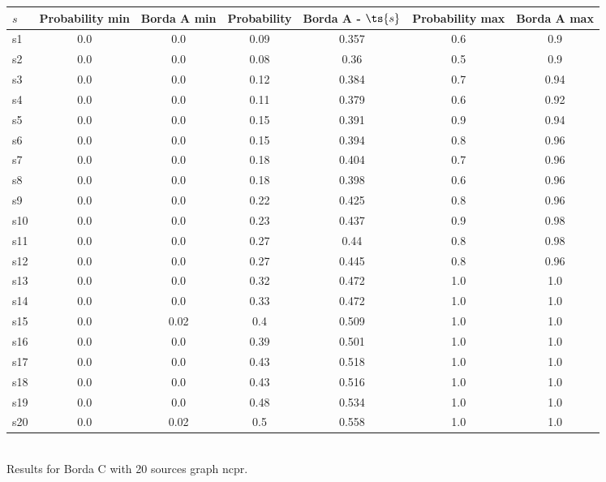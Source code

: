 \documentclass{article}
\begin{document}
\noindent\begin{tabular}{|l|c|c|c|c|c|c|}
\hline
$s$& Probability min & Borda A min & Probability & Borda A - $\ts{s}$ & Probability max & Borda A max\\
\hline
s1 &0.0 & 0.0 & 0.09 & 0.357 & 0.6 & 0.9\\
\hline
s2 &0.0 & 0.0 & 0.08 & 0.36 & 0.5 & 0.9\\
\hline
s3 &0.0 & 0.0 & 0.12 & 0.384 & 0.7 & 0.94\\
\hline
s4 &0.0 & 0.0 & 0.11 & 0.379 & 0.6 & 0.92\\
\hline
s5 &0.0 & 0.0 & 0.15 & 0.391 & 0.9 & 0.94\\
\hline
s6 &0.0 & 0.0 & 0.15 & 0.394 & 0.8 & 0.96\\
\hline
s7 &0.0 & 0.0 & 0.18 & 0.404 & 0.7 & 0.96\\
\hline
s8 &0.0 & 0.0 & 0.18 & 0.398 & 0.6 & 0.96\\
\hline
s9 &0.0 & 0.0 & 0.22 & 0.425 & 0.8 & 0.96\\
\hline
s10 &0.0 & 0.0 & 0.23 & 0.437 & 0.9 & 0.98\\
\hline
s11 &0.0 & 0.0 & 0.27 & 0.44 & 0.8 & 0.98\\
\hline
s12 &0.0 & 0.0 & 0.27 & 0.445 & 0.8 & 0.96\\
\hline
s13 &0.0 & 0.0 & 0.32 & 0.472 & 1.0 & 1.0\\
\hline
s14 &0.0 & 0.0 & 0.33 & 0.472 & 1.0 & 1.0\\
\hline
s15 &0.0 & 0.02 & 0.4 & 0.509 & 1.0 & 1.0\\
\hline
s16 &0.0 & 0.0 & 0.39 & 0.501 & 1.0 & 1.0\\
\hline
s17 &0.0 & 0.0 & 0.43 & 0.518 & 1.0 & 1.0\\
\hline
s18 &0.0 & 0.0 & 0.43 & 0.516 & 1.0 & 1.0\\
\hline
s19 &0.0 & 0.0 & 0.48 & 0.534 & 1.0 & 1.0\\
\hline
s20 &0.0 & 0.02 & 0.5 & 0.558 & 1.0 & 1.0\\
\hline
\end{tabular}\\

\noindent Results for Borda C with 20 sources graph ncpr.
\end{document}
